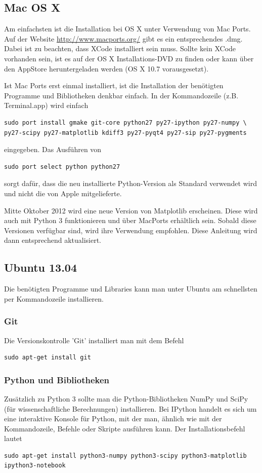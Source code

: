 \subsection{Mac OS X}


Am einfachsten ist die Installation bei OS X unter Verwendung von Mac Ports.
Auf der Website \url{http://www.macports.org/} gibt es ein entsprechendes .dmg.
Dabei ist zu beachten, dass XCode installiert sein muss. Sollte kein XCode vorhanden sein, ist es auf der OS X Installations-DVD zu finden oder kann über den AppStore heruntergeladen werden (OS X 10.7 vorausgesetzt).

Ist Mac Ports erst einmal installiert, ist die Installation der benötigten Programme und Bibliotheken denkbar einfach.
In der Kommandozeile (z.B. Terminal.app) wird einfach
\begin{verbatim}
sudo port install gmake git-core python27 py27-ipython py27-numpy \
py27-scipy py27-matplotlib kdiff3 py27-pyqt4 py27-sip py27-pygments
\end{verbatim}
eingegeben.
Das Ausführen von
\begin{verbatim}
sudo port select python python27
\end{verbatim}
sorgt dafür, dass die neu installierte Python-Version als Standard verwendet wird und nicht die von Apple mitgelieferte.

Mitte Oktober 2012 wird eine neue Version von Matplotlib erscheinen.
Diese wird auch mit Python 3 funktionieren und über MacPorts erhältlich sein.
Sobald diese Versionen verfügbar sind, wird ihre Verwendung empfohlen.
Diese Anleitung wird dann entsprechend aktualisiert.

\subsection{Ubuntu 13.04}
Die benötigten Programme und Libraries kann man unter Ubuntu am schnellsten per Kommandozeile installieren.

\subsubsection{Git}
Die Versionskontrolle 'Git' installiert man mit dem Befehl
\begin{verbatim}
sudo apt-get install git
\end{verbatim}

\subsubsection{Python und Bibliotheken}
Zusätzlich zu Python 3 sollte man die Python-Bibliotheken NumPy und SciPy (für wissenschaftliche Berechnungen) installieren.
Bei IPython handelt es sich um eine interaktive Konsole für Python, mit der man, ähnlich wie mit der Kommandozeile, Befehle oder Skripte ausführen kann.
Der Installationsbefehl lautet
\begin{verbatim}
sudo apt-get install python3-numpy python3-scipy python3-matplotlib ipython3-notebook
\end{verbatim}

